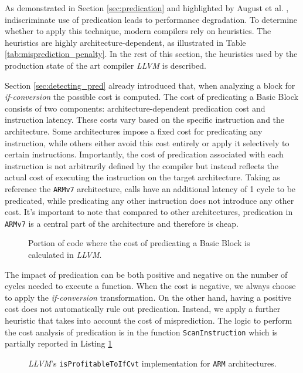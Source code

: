 As demonstrated in Section \ref{sec:predication} and highlighted by August et al. \cite{August98}, indiscriminate use of predication leads to performance degradation.
To determine whether to apply this technique, modern compilers rely on heuristics. The heuristics are highly architecture-dependent, as illustrated in Table \ref{tab:misprediction_penalty}. In the rest of this section, the heuristics used by the production state of the art compiler \textit{LLVM} is described.

Section \ref{sec:detecting_pred} already introduced that, when analyzing a block for \textit{if-conversion} the possible cost is computed. The cost of predicating a Basic Block consists of two components: architecture-dependent predication cost and instruction latency. These costs vary based on the specific instruction and the architecture. Some architectures impose a fixed cost for predicating any instruction, while others either avoid this cost entirely or apply it selectively to certain instructions. Importantly, the cost of predication associated with each instruction is not arbitrarily defined by the compiler but instead reflects the actual cost of executing the instruction on the target architecture. Taking as reference the \texttt{ARMv7} architecture, calls have an additional latency of 1 cycle to be predicated, while predicating any other instruction does not introduce any other cost. It's important to note that compared to other architectures, predication in \texttt{ARMv7} is a central part of the architecture and therefore is cheap.

\begin{figure}[H]
    \centering
    
    \caption{Portion of code where the cost of predicating a Basic Block is calculated in \textit{LLVM}.}
    \label{lst:predication_cost}
\end{figure}

The impact of predication can be both positive and negative on the number of cycles needed to execute a function. When the cost is negative, we always choose to apply the \textit{if-conversion} transformation. On the other hand, having a positive cost does not automatically rule out predication. Instead, we apply a further heuristic that takes into account the cost of misprediction.
The logic to perform the cost analysis of predication is in the function \texttt{ScanInstruction} which is partially reported in Listing \ref{lst:predication_cost}

\begin{figure}[H]
    \centering
    
    \caption{\textit{LLVM}'s \texttt{isProfitableToIfCvt} implementation for \texttt{ARM} architectures.}
    \label{lst:predications_heuristic}
\end{figure}

